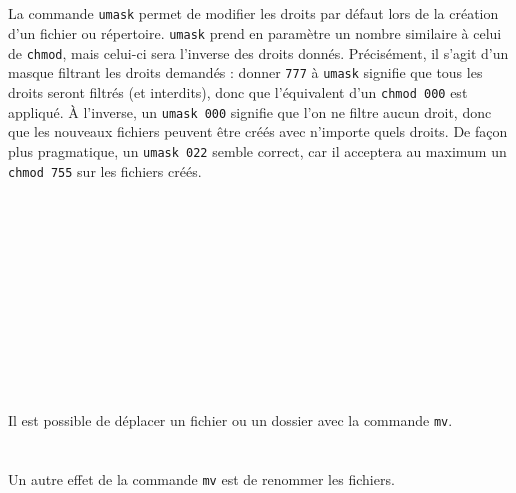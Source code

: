 \\
\\
\\

\\

La commande \texttt{umask} permet de modifier les droits par défaut lors de la création d'un fichier ou répertoire.
\texttt{umask} prend en paramètre un nombre similaire à celui de \texttt{chmod}, mais celui-ci sera l'inverse des droits donnés.
Précisément, il s'agit d'un masque filtrant les droits demandés : donner \texttt{777} à \texttt{umask} signifie que tous les droits seront filtrés (et interdits), donc que l'équivalent d'un \texttt{chmod 000} est appliqué.
À l'inverse, un \texttt{umask 000} signifie que l'on ne filtre aucun droit, donc que les nouveaux fichiers peuvent être créés avec n'importe quels droits.
De façon plus pragmatique, un \texttt{umask 022} semble correct, car il acceptera au maximum un \texttt{chmod 755} sur les fichiers créés.\\

\\
\\
\\
\\
\\
\\
\\
\\
\\
\\
\\

\bigskip

Il est possible de déplacer un fichier ou un dossier avec la commande \texttt{mv}.\\

\\
\\

Un autre effet de la commande \texttt{mv} est de renommer les fichiers.\\

